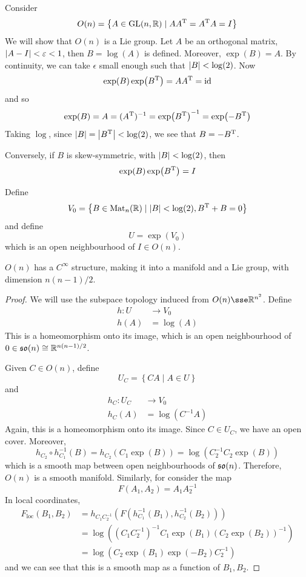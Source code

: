 \documentclass{article}
\begin{document}
\begin{example}
    Consider
    \[O(n) = \left\{A \in \operatorname{GL}(n, \mathbb{R}) \mid AA^{\mathrm{T}} = A^{\mathrm{T}} A = I\right\}\]
    We will show that \(O(n)\) is a Lie group. Let \(A\) be an orthogonal matrix, \(\abs{A - I} < \varepsilon < 1\), then \(B = \log(A)\) is defined. Moreover, \(\exp(B) = A\). By continuity, we can take \(\epsilon\) small enough such that \(\abs{B} < \log(2)\). Now
    \[\exp(B)\exp(B^{\mathrm{T}}) = AA^{\mathrm{T}} = \operatorname{id}\]
    and so
    \[\exp(B) = A = (A^{\mathrm{T}})^{-1} = \exp(B^{\mathrm{T}})^{-1} = \exp(-B^{\mathrm{T}})\]
    Taking \(\log\), since \(\abs{B} = \abs{B^{\mathrm{T}}} < \log(2)\), we see that \(B = -B^{\mathrm{T}}\).

    Conversely, if \(B\) is skew-symmetric, with \(\abs{B} < \log(2)\), then
    \[\exp(B)\exp(B^{\mathrm{T}}) = I\]

    Define
    \[V_0 = \left\{B \in \operatorname{Mat}_n(\mathbb{R}) \mid  \abs{B} < \log(2), B^{\mathrm{T}} + B = 0\right\}\]
    and define
    \[U = \exp(V_0)\]
    which is an open neighbourhood of \(I \in O(n)\).

    \begin{proposition}
        \(O(n)\) has a \(C^\infty\) structure, making it into a manifold and a Lie group, with dimension \(n(n-1)/2\).
    \end{proposition}

    \begin{proof}
        We will use the subspace topology induced from \(O(n) \sse \R^{n^2}\). Define
        \begin{align*}
            h : U &\to V_0 \\
            h(A) &= \log(A)
        \end{align*}
        This is a homeomorphism onto its image, which is an open neighbourhood of \(0 \in \mathfrak{so}(n) \cong \mathbb{R}^{n(n-1)/2}\).

        Given \(C \in O(n)\), define
        \[U_C = \left\{CA \mid A \in U\right\}\]
        and
        \begin{align*}
            h_C : U_C &\to V_0 \\
            h_C(A) &= \log(C^{-1}A)
        \end{align*}
        Again, this is a homeomorphism onto its image. Since \(C \in U_C\), we have an open cover. Moreover,
        \[h_{C_2} \circ h_{C_1}^{-1}(B) = h_{C_2}(C_1\exp(B)) = \log(C_2^{-1}C_2\exp(B))\]
        which is a smooth map between open neighbourhoods of \(\mathfrak{so}(n)\). Therefore, \(O(n)\) is a smooth manifold. Similarly, for consider the map
        \[F(A_1, A_2) = A_1A_2^{-1}\]
        In local coordinates,
        \begin{align*}
            F_{\text{loc}}(B_1, B_2) &= h_{C_1C_2^{-1}}(F(h_{C_1}^{-1}(B_1), h_{C_2}^{-1}(B_2))) \\
            &= \log((C_1C_2^{-1})^{-1}C_1\exp(B_1)(C_2\exp(B_2))^{-1}) \\
            &= \log(C_2\exp(B_1)\exp(-B_2)C_2^{-1})
        \end{align*}
        and we can see that this is a smooth map as a function of \(B_1, B_2\).
    \end{proof}
\end{example}
\end{document}
